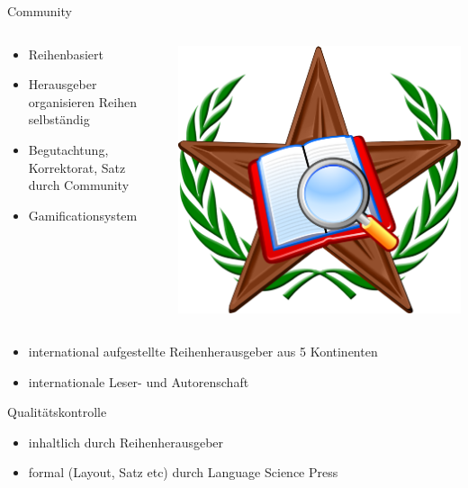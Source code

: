 \documentclass[final]{beamer}
\begin{document}
\begin{frame}{}
\begin{columns}[t]
\begin{column}{.45\linewidth}
    \begin{block}{Community}
 \begin{columns}
    \begin{column}{.48\linewidth}
      \begin{itemize}
      \item Reihenbasiert 
      \item Herausgeber organisieren Reihen selbst{\"a}ndig
      \item Begutachtung, Korrektorat, Satz durch Community
      \item Gamificationsystem 
      \end{itemize} 
 \end{column}
    \begin{column}{.48\linewidth}
\hspace{3cm}
\includegraphics[width=.5\textwidth]{barnstar.png}
 \end{column}
 \end{columns}
      \begin{itemize}
      \item international aufgestellte Reihenherausgeber aus 5 Kontinenten
      \item internationale Leser- und Autorenschaft
      \end{itemize}
    \end{block}
 

    \begin{block}{Qualit{\"a}tskontrolle}
      \begin{itemize}
      \item inhaltlich durch Reihenherausgeber
      \item formal (Layout, Satz etc) durch Language Science Press
      \end{itemize} 
    \end{block}


\end{column}
\end{columns}
\end{frame}
\end{document}
